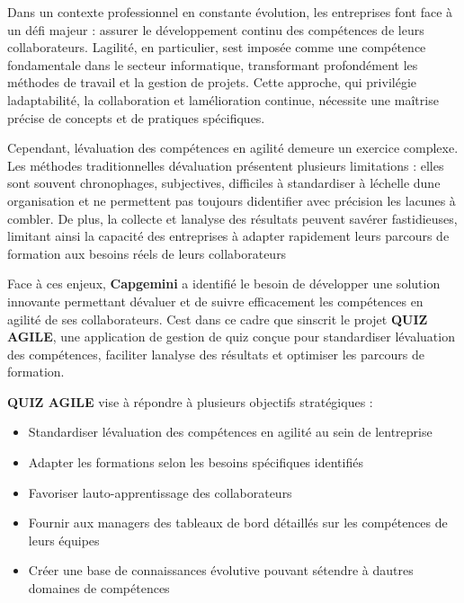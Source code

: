 \documentclass[12pt,a4paper,twoside]{report}
\begin{document}
Dans un contexte professionnel en constante évolution, les entreprises
font face à un défi majeur : assurer le développement continu des
compétences de leurs collaborateurs. L\textquotesingle agilité, en
particulier, s\textquotesingle est imposée comme une compétence
fondamentale dans le secteur informatique, transformant profondément les
méthodes de travail et la gestion de projets. Cette approche, qui
privilégie l\textquotesingle adaptabilité, la collaboration et
l\textquotesingle amélioration continue, nécessite une maîtrise précise
de concepts et de pratiques spécifiques.

Cependant, l\textquotesingle évaluation des compétences en agilité
demeure un exercice complexe. Les méthodes traditionnelles
d\textquotesingle évaluation présentent plusieurs limitations : elles
sont souvent chronophages, subjectives, difficiles à standardiser à
l\textquotesingle échelle d\textquotesingle une organisation et ne
permettent pas toujours d\textquotesingle identifier avec précision les
lacunes à combler. De plus, la collecte et l\textquotesingle analyse des
résultats peuvent s\textquotesingle avérer fastidieuses, limitant ainsi
la capacité des entreprises à adapter rapidement leurs parcours de
formation aux besoins réels de leurs collaborateurs

Face à ces enjeux, \textbf{Capgemini} a identifié le besoin de
développer une solution innovante permettant d\textquotesingle évaluer
et de suivre efficacement les compétences en agilité de ses
collaborateurs. C\textquotesingle est dans ce cadre que
s\textquotesingle inscrit le projet \textbf{QUIZ AGILE}, une application
de gestion de quiz conçue pour standardiser l\textquotesingle évaluation
des compétences, faciliter l\textquotesingle analyse des résultats et
optimiser les parcours de formation.

\textbf{QUIZ AGILE} vise à répondre à plusieurs objectifs stratégiques :

\begin{itemize}
\item
  Standardiser l\textquotesingle évaluation des compétences en agilité
  au sein de l\textquotesingle entreprise
\item
  Adapter les formations selon les besoins spécifiques identifiés
\item
  Favoriser l\textquotesingle auto-apprentissage des collaborateurs
\item
  Fournir aux managers des tableaux de bord détaillés sur les
  compétences de leurs équipes
\item
  Créer une base de connaissances évolutive pouvant
  s\textquotesingle étendre à d\textquotesingle autres domaines de
  compétences
\end{itemize}
\end{document}
